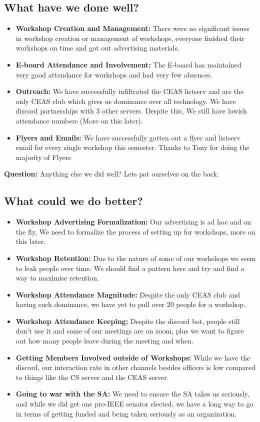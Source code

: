 \documentclass{article}
\begin{document}
\subsection{What have we done well?}
\begin{itemize}
    \item \textbf{Workshop Creation and Management:} There were no significant issues in workshop creation or management of workshops, everyone finished their workshops on time and got out advertising materials. 
    \item \textbf{E-board Attendance and Involvement:} The E-board has maintained very good attendance for workshops and had very few absences. 
    \item \textbf{Outreach:} We have successfully infiltrated the CEAS listserv and are the only CEAS club which gives us dominance over all technology. We have discord partnerships with 3 other servers. Despite this, We still have lowish attendance numbers (More on this later).
    \item \textbf{Flyers and Emails:} We have successfully gotten out a flyer and listserv email for every single workshop this semester. Thanks to Tony for doing the majority of Flyers
\end{itemize}

\textbf{Question:} Anything else we did well? Lets pat ourselves on the back. 
\newpage
\subsection{What could we do better?}\label{wdb}
\begin{itemize}
    \item \textbf{Workshop Advertising Formalization:} Our advertising is ad hoc and on the fly, We need to formalize the process of setting up for workshops, more on this later.
    \item \textbf{Workshop Retention:} Due to the nature of some of our workshops we seem to leak people over time. We should find a pattern here and try and find a way to maximise retention. 
    \item \textbf{Workshop Attendance Magnitude:} Despite the only CEAS club and having such dominance, we have yet to pull over 20 people for a workshop. 
    \item \textbf{Workshop Attendance Keeping:} Despite the discord bot, people still don't use it and some of our meetings are on zoom, plus we want to figure out how many people leave during the meeting and when. 
    \item \textbf{Getting Members Involved outside of Workshops:} While we have the discord, our interaction rate in other channels besides officers is low compared to things like the CS server and the CEAS server. 
    \item \textbf{Going to war with the SA:} We need to ensure the SA takes us seriously, and while we did get one pro-IEEE senator elected, we have a long way to go in terms of getting funded and being taken seriously as an organization. 
\end{itemize}
\end{document}
